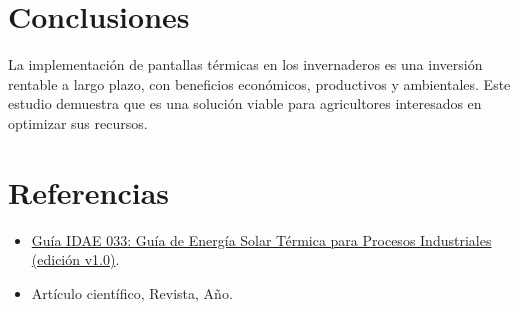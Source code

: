 \documentclass[conference,12pt]{IEEEtran}
\begin{document}
\begin{Form}
\section{Conclusiones}
La implementación de pantallas térmicas en los invernaderos es una inversión rentable a largo plazo, con beneficios económicos, productivos y ambientales. Este estudio demuestra que es una solución viable para agricultores interesados en optimizar sus recursos.

\section{Referencias}
\begin{itemize}
    \item \href{https://www.idae.es/publicaciones/guia-de-energia-solar-termica-para-procesos-industriales}
    {Guía IDAE 033: Guía de Energía Solar Térmica para Procesos Industriales (edición v1.0)}.

    \item Artículo científico, Revista, Año.
\end{itemize}

\end{Form}
\end{document}
